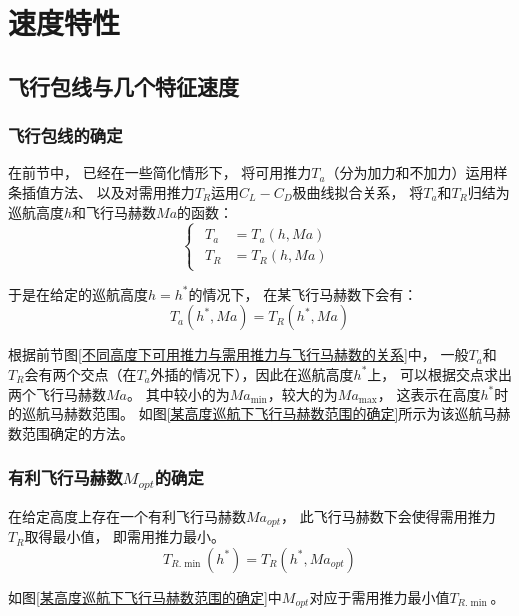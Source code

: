 \section{速度特性}

\subsection{飞行包线与几个特征速度}

\subsubsection{飞行包线的确定}

在前节中，
已经在一些简化情形下，
将可用推力$T_a$（分为加力和不加力）运用样条插值方法、
以及对需用推力$T_R$运用$C_L-C_D$极曲线拟合关系，
将$T_a$和$T_R$归结为巡航高度$h$和飞行马赫数$Ma$的函数：
\begin{equation}
    \begin{cases}
        \begin{aligned}
            T_a & = T_a(h,Ma)\\
            T_R & = T_R(h,Ma)
        \end{aligned}
    \end{cases}
\end{equation}

于是在给定的巡航高度$h=h^*$的情况下，
在某飞行马赫数下会有：
\begin{equation}
    T_a(h^*,Ma) = T_R(h^*,Ma)
\end{equation}

根据前节图\ref{不同高度下可用推力与需用推力与飞行马赫数的关系}中，
一般$T_a$和$T_R$会有两个交点（在$T_a$外插的情况下），因此在巡航高度$h^*$上，
可以根据交点求出两个飞行马赫数$Ma$。
其中较小的为$Ma_{\min}$，较大的为$Ma_{\max}$，
这表示在高度$h^*$时的巡航马赫数范围。
如图\ref{某高度巡航下飞行马赫数范围的确定}所示为该巡航马赫数范围确定的方法。

\subsubsection{有利飞行马赫数$M_{opt}$的确定}

在给定高度上存在一个有利飞行马赫数$Ma_{opt}$，
此飞行马赫数下会使得需用推力$T_R$取得最小值，
即需用推力最小。
\begin{equation}
    T_{R.\min}(h^*) = T_R(h^*, Ma_{opt})
\end{equation}

如图\ref{某高度巡航下飞行马赫数范围的确定}中$M_{opt}$对应于需用推力最小值$T_{R.\min}$。


